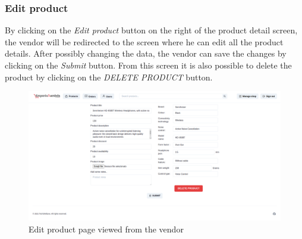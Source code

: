 \subsubsection{Edit product}
By clicking on the \textit{Edit product} button on the right of the product detail screen, the vendor will be redirected to the screen where he can edit all the product details. After possibly changing the data, the vendor can save the changes by clicking on the \textit{Submit} button. From this screen it is also possible to delete the product by clicking on the \textit{DELETE PRODUCT} button.
\begin{figure}[!ht]
    \caption{Edit product page viewed from the vendor}
    \vspace{5px}
    \includegraphics[scale=0.25]{../../../../Images/userManual/editProductVendor.png}
    \centering
\end{figure}
